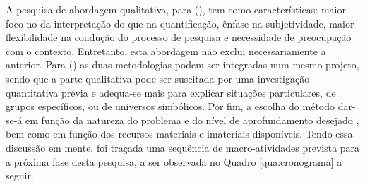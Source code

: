 A pesquisa de abordagem qualitativa, para  (\citeyear{CASELL1994}), tem como características: maior foco no da interpretação do que na quantificação, ênfase na subjetividade, maior flexibilidade na condução do processo de pesquisa e necessidade de preocupação com o contexto.
Entretanto, esta abordagem não exclui necessariamente a anterior. Para  (\citeyear{MINAYO1996}) as duas metodologias podem ser integradas num mesmo projeto, sendo que a parte qualitativa pode ser suscitada por uma investigação quantitativa prévia e adequa-se mais para explicar situações particulares, de grupos específicos, ou de universos simbólicos.
Por fim, a escolha do método dar-se-á em função da natureza do problema e do nível de aprofundamento desejado \cite{DIEHL2004}, bem como em função dos recursos materiais e imateriais disponíveis.
Tendo essa discussão em mente, foi traçada uma sequência de macro-atividades prevista para a próxima fase desta pesquisa, a ser observada no Quadro \ref{qua:cronograma} a seguir.

